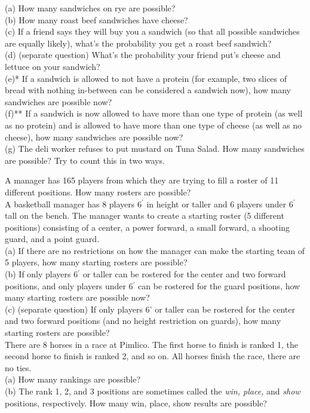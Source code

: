 \documentclass[12pt]{article}
\begin{document}
\noindent (a) How many sandwiches on rye are possible?\\
(b) How many roast beef sandwiches have cheese?\\
(c) If a friend says they will buy you a sandwich (so that all possible sandwiches are equally likely), what's the probability you get a roast beef sandwich?\\
(d) (separate question) What's the probability your friend put's cheese and lettuce on your sandwich?\\
(e)* If a sandwich is allowed to not have a protein (for example, two slices of bread with nothing in-between can be considered a sandwich now), how many sandwiches are possible now?\\
(f)** If a sandwich is now allowed to have more than one type of protein (as well as no protein) and is allowed to have more than one type of cheese (as well as no cheese), how many sandwiches are possible now?\\
(g) The deli worker refuses to put mustard on Tuna Salad.  How many sandwiches are possible? Try to count this in two ways.\medskip


\newpage


 A manager has 165 players from which they are trying to fill a roster of 11 different positions.
How many rosters are possible?\\


 A basketball manager has 8 players 6$^{\prime}$ in height or taller
and 6 players under 6$^{\prime}$ tall on the bench.  The manager wants to create a starting roster
(5 different positions) consisting of a center, a power forward, a small forward, a shooting guard, and a point guard.\\
(a) If there are no restrictions on how the manager can make the starting team of 5 players, how many starting rosters are possible?\\
(b) If only players 6$^{\prime}$ or taller can be rostered for the center and two forward positions, and only players under 6$^{\prime}$ can be rostered for the guard positions,
how many starting rosters are possible now?\\
(c) (separate question) If only players 6' or taller can be rostered for the center and two forward positions (and no height restriction on guards), how many starting
rosters are possible?\\



 There are 8 horses in a race at Pimlico. The first horse to finish is ranked 1, the second horse to finish is ranked 2, and so on.
All horses finish the race, there are no ties. \\
(a) How many rankings are possible?\\
(b) The rank 1, 2, and 3 positions are sometimes called the {\em win, place,} and {\em show} positions, respectively.  How many win, place, show results are possible?\\
\end{document}
